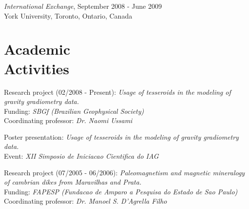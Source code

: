 \documentclass[margin,line]{resume}
\begin{document}
\begin{resume}
\begin{list1}
        \item[] \textit{International Exchange}, September 2008 - June 2009\\
        York University, Toronto, Ontario, Canada\vspace{2mm}%

        \end{list1}

		\section{\mysidestyle Academic\\Activities}
		
		\begin{list1}
		
		\item[] Research project (02/2008 - Present): \textit{Usage of tesseroids in the modeling of gravity gradiometry data.}\\
						Funding: \textit{SBGf (Brazilian Geophysical Society)}\\
						Coordinating professor: \textit{Dr. Naomi Ussami}\\

		\item[] Poster presentation: \textit{Usage of tesseroids in the modeling of gravity gradiometry data.}\\ 
                        Event: \textit{XII Simposio de Iniciacao Cientifica do IAG}\\

		\item[] Research project (07/2005 - 06/2006): \textit{Paleomagnetism and magnetic mineralogy of cambrian dikes from Maravilhas and Prata.}\\
						Funding: \textit{FAPESP (Fundacao de Amparo a Pesquisa do Estado de Sao Paulo)}\\
						Coordinating professor: \textit{Dr. Manoel S. D'Agrella Filho}\\


\end{list1}
\end{resume}
\end{document}
